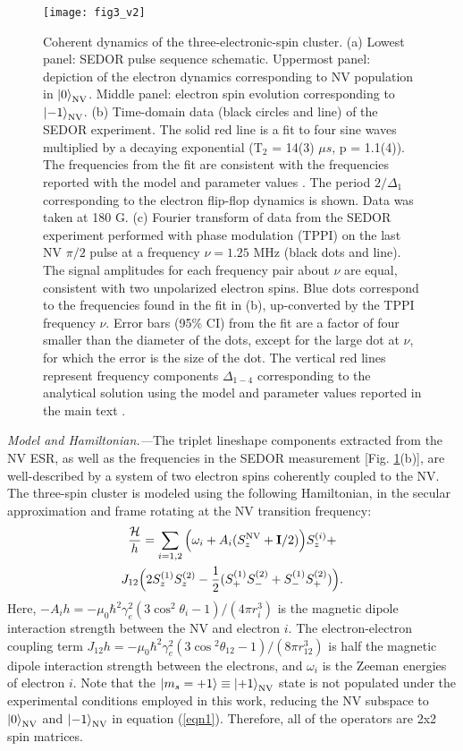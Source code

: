 \documentclass[%
 reprint,
 amsmath,amssymb,
 aps,
]{revtex4-1}
\begin{document}
\begin{figure*}[t!]
\centering
\texttt{[image: fig3\_v2]}
\caption{\label{fig:fig3} Coherent dynamics of the three-electronic-spin cluster. (a) Lowest panel: SEDOR pulse sequence schematic. Uppermost panel: depiction of the electron dynamics corresponding to NV population in $\ket{0}_{\text{NV}}$. Middle panel: electron spin evolution corresponding to $\ket{-1}_{\text{NV}}$. (b) Time-domain data (black circles and line) of the SEDOR experiment. The solid red line is a fit to four sine waves multiplied by a decaying exponential (T$_2$ = 14(3) $\mu s$, p = 1.1(4)). The frequencies from the fit are consistent with the frequencies reported with the model and parameter values \cite{suppl}. The period $2/\Delta_1$ corresponding to the electron flip-flop dynamics is shown. Data was taken at 180 G. (c) Fourier transform of data from the SEDOR experiment performed with phase modulation (TPPI) on the last NV $\pi/2$ pulse at a frequency $\nu=1.25\text{ MHz}$ (black dots and line). The signal amplitudes for each frequency pair about $\nu$ are equal, consistent with two unpolarized electron spins. Blue dots correspond to the frequencies found in the fit in (b), up-converted by the TPPI frequency $\nu$. Error bars (95\% CI) from the fit are a factor of four smaller than the diameter of the dots, except for the large dot at $\nu$, for which the error is the size of the dot. The vertical red lines represent frequency components $\Delta_{1-4}$ corresponding to the analytical solution using the model and parameter values reported in the main text \cite{suppl}.}
\end{figure*}
    
\textit{Model and Hamiltonian.---}The triplet lineshape components extracted from the NV ESR, as well as the frequencies in the SEDOR measurement [Fig. \ref{fig:fig3}(b)], are well-described by a system of two electron spins coherently coupled to the NV. The three-spin cluster is modeled using the following Hamiltonian, in the secular approximation and frame rotating at the NV transition frequency:
\begin{multline}
\frac{\mathcal{H}}{h} = \sum_{i = 1,2} {\Big(\omega_i + A_i(S_{z}^{\text{NV}} + {\bf{I}} /2)\Big)}S_{z}^{(i)} +\\ 
J_{12} \Big(2 S_{z}^{(1)}S_{z}^{(2)} - \frac{1}{2}(S_{+}^{(1)} S_{-}^{(2)} + S_{-}^{(1)} S_+^{(2)})\Big).
\label{eqn1}
\end{multline}Here, $-A_ih=-\mu_0\hbar^2\gamma_e^2(3\cos^2⁡{\theta_i}-1)/(4\pi r_i^3)$ is the magnetic dipole interaction strength between the NV and electron $i$. The electron-electron coupling term $J_{12}h=-\mu_0\hbar^2\gamma_e^2(3\cos⁡^2{\theta_{12}}-1)/(8\pi r_{12}^3)$ is half the magnetic dipole interaction strength between the electrons, and $\omega_{i}$ is the Zeeman energies of electron $i$. Note that the $\ket{m_s=+1}\equiv\ket{+1}_{\text{NV}}$ state is not populated under the experimental conditions employed in this work, reducing the NV subspace to $\ket{0}_{\text{NV}}$ and $\ket{-1}_{\text{NV}}$ in equation (\ref{eqn1}). Therefore, all of the operators are 2x2 spin matrices.
\end{document}
